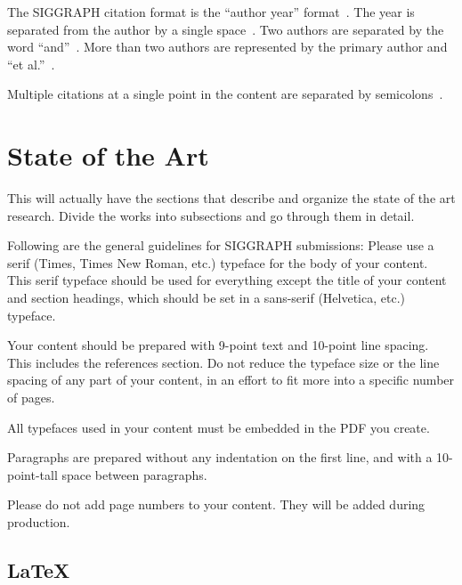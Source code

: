 \documentclass[tog]{acmsiggraph}
\begin{document}
The SIGGRAPH citation format is the ``author year''
format~\cite{Pellacini:2005:LAH}. The year is separated from the
author by a single space~\cite{yee:2000:ssa}. Two authors are
separated by the word ``and''~\cite{parke:1996:CFA}. More than two
authors are represented by the primary author and ``et al.''~\cite{levoy:2000:TDM}.

Multiple citations at a single point in the content are separated by
semicolons~\cite{levoy:2000:TDM,sako:2001:SSB}.


\section{State of the Art}

This will actually have the sections that describe and organize the state of the art research.
Divide the works into subsections and go through them in detail.

Following are the general guidelines for SIGGRAPH submissions:
Please use a serif (Times, Times New Roman, etc.) typeface for the
body of your content. This serif typeface should be used for
everything except the title of your content and section headings,
which should be set in a sans-serif (Helvetica, etc.) typeface.

Your content should be prepared with 9-point text and 10-point line
spacing. This includes the references section. Do not reduce the
typeface size or the line spacing of any part of your content, in an
effort to fit more into a specific number of pages. 

All typefaces used in your content must be embedded in the PDF you
create. 

Paragraphs are prepared without any indentation on the first line, and
with a 10-point-tall space between paragraphs.

Please do not add page numbers to your content. They will be added
during production.






\subsection{\LaTeX}
\end{document}
